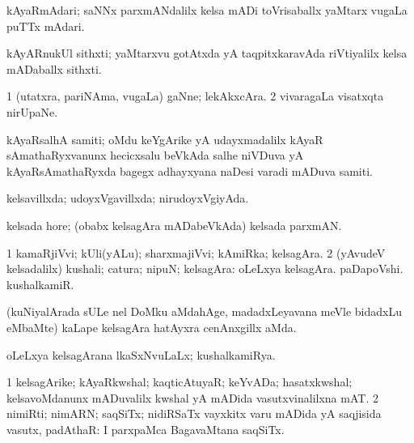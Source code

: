 {{{{{{\begin{center}
\bentry
{} 
\gl{\nA}
\expl{}
\bmng
kAyaRmAdari; saNNx parxmANdalilx kelsa mADi toVrisaballx yaMtarx \mo vugaLa puTTx mAdari. 
\emng
\eentry

\bentry
{} 
\gl{\nA}
\expl{}
\bmng
kAyARnukUl sithxti; yaMtarxvu gotAtxda yA taqpitxkaravAda riVtiyalilx kelsa mADaballx sithxti. 
\emng
\eentry

\bentry
{} 
\gl{\nA}
\expl{}
\bmng
\bnum
\num{1} (utatxra, pariNAma, \mo vugaLa) gaNne; lekAkxcAra. 
\num{2} vivaragaLa visatxqta nirUpaNe. 
\enum
\emng
\eentry

\bentry
{} 
\gl{\nA}
\expl{}
\bmng
kAyaRsalhA samiti; oMdu keYgArike yA udayxmadalilx kAyaR sAmathaRyxvanunx hecicxsalu beVkAda salhe niVDuva yA kAyaRsAmathaRyxda bagegx adhayxyana naDesi varadi mADuva samiti. 
\emng
\eentry

\bentry
{} 
\gl{\gu}
\expl{}
\bmng
kelsavillxda; udoyxVgavillxda; nirudoyxVgiyAda. 
\emng
\eentry

\bentry
{} 
\gl{\nA}
\expl{}
\bmng
kelsada hore; (obabx kelsagAra mADabeVkAda) kelsada parxmAN. 
\emng
\eentry

\bentry
{} 
\gl{\nA}
\bmng
\bnum
\num{1} kamaRjiVvi; kUli(yALu); sharxmajiVvi; kAmiRka; kelsagAra. 
\num{2} (yAvudeV kelsadalilx) kushali; catura; nipuN; kelsagAra:  oLeLxya kelsagAra.  paDapoVshi.  kushalkamiR. 
\enum
\emng

\noindent
\gl{\pagu}
\expl{}
\bmng
{} (kuNiyalArada sULe nel DoMku aMdahAge, madadxLeyavana meVle bidadxLu eMbaMte) kaLape kelsagAra hatAyxra cenAnxgillx aMda. 
\emng
\eentry

\bentry
{} 
\gl{\gu}
\expl{}
\bmng
oLeLxya kelsagArana lkaSxNvuLaLx; kushalkamiRya. 
\emng
\eentry

\bentry
{} 
\gl{\nA}
\expl{}
\bmng
\bnum
\num{1} kelsagArike; kAyaRkwshal; kaqticAtuyaR; keYvADa; hasatxkwshal; kelsavoMdanunx mADuvalilx kwshal yA mADida vasutxvinalilxna mAT. 
\num{2} nimiRti; nimARN; saqSiTx; nidiRSaTx vayxkitx \mo varu mADida yA saqjisida vasutx, padAthaR:  I parxpaMca BagavaMtana saqSiTx. 
\enum
\emng
\eentry


\end{center}}}}}}}
